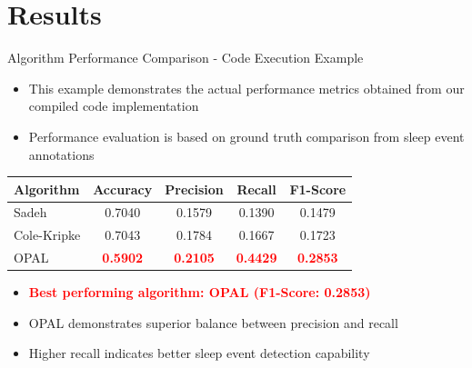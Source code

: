 \documentclass[10pt]{beamer} %
\begin{document}
\section{Results}

\begin{frame}{Algorithm Performance Comparison - Code Execution Example}
\begin{itemize}
  \item \footnotesize This example demonstrates the actual performance metrics obtained from our compiled code implementation
  \item \footnotesize Performance evaluation is based on ground truth comparison from sleep event annotations
\end{itemize}

\begin{table}[h]
\centering
\footnotesize
\begin{tabular}{|l|c|c|c|c|}
\hline
\textbf{Algorithm} & \textbf{Accuracy} & \textbf{Precision} & \textbf{Recall} & \textbf{F1-Score} \\
\hline
Sadeh & 0.7040 & 0.1579 & 0.1390 & 0.1479 \\
Cole-Kripke & 0.7043 & 0.1784 & 0.1667 & 0.1723 \\
OPAL & \textcolor{red}{\textbf{0.5902}} & \textcolor{red}{\textbf{0.2105}} & \textcolor{red}{\textbf{0.4429}} & \textcolor{red}{\textbf{0.2853}} \\
\hline
\end{tabular}
\end{table}

\begin{itemize}
  \item \footnotesize \textcolor{red}{\textbf{Best performing algorithm: OPAL (F1-Score: 0.2853)}}
  \item \footnotesize OPAL demonstrates superior balance between precision and recall
  \item \footnotesize Higher recall indicates better sleep event detection capability
\end{itemize}
\end{frame}
\end{document}

